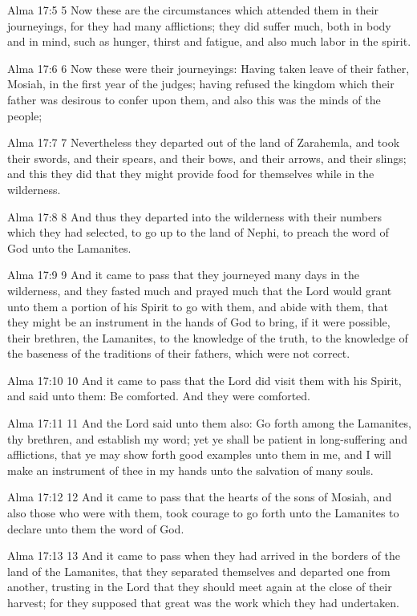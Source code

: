 Alma 17:5
 5 Now these are the circumstances which attended them in their
journeyings, for they had many afflictions; they did suffer much,
both in body and in mind, such as hunger, thirst and fatigue, and
also much labor in the spirit.

Alma 17:6
 6 Now these were their journeyings: Having taken leave of their
father, Mosiah, in the first year of the judges; having refused
the kingdom which their father was desirous to confer upon them,
and also this was the minds of the people;

Alma 17:7
 7 Nevertheless they departed out of the land of Zarahemla, and
took their swords, and their spears, and their bows, and their
arrows, and their slings; and this they did that they might
provide food for themselves while in the wilderness.

Alma 17:8
 8 And thus they departed into the wilderness with their numbers
which they had selected, to go up to the land of Nephi, to preach
the word of God unto the Lamanites.

Alma 17:9
 9 And it came to pass that they journeyed many days in the
wilderness, and they fasted much and prayed much that the Lord
would grant unto them a portion of his Spirit to go with them,
and abide with them, that they might be an instrument in the
hands of God to bring, if it were possible, their brethren, the
Lamanites, to the knowledge of the truth, to the knowledge of the
baseness of the traditions of their fathers, which were not
correct.

Alma 17:10
 10 And it came to pass that the Lord did visit them with his
Spirit, and said unto them: Be comforted. And they were
comforted.

Alma 17:11
 11 And the Lord said unto them also: Go forth among the
Lamanites, thy brethren, and establish my word; yet ye shall be
patient in long-suffering and afflictions, that ye may show forth
good examples unto them in me, and I will make an instrument of
thee in my hands unto the salvation of many souls.

Alma 17:12
 12 And it came to pass that the hearts of the sons of Mosiah,
and also those who were with them, took courage to go forth unto
the Lamanites to declare unto them the word of God.

Alma 17:13
 13 And it came to pass when they had arrived in the borders of
the land of the Lamanites, that they separated themselves and
departed one from another, trusting in the Lord that they should
meet again at the close of their harvest; for they supposed that
great was the work which they had undertaken.

